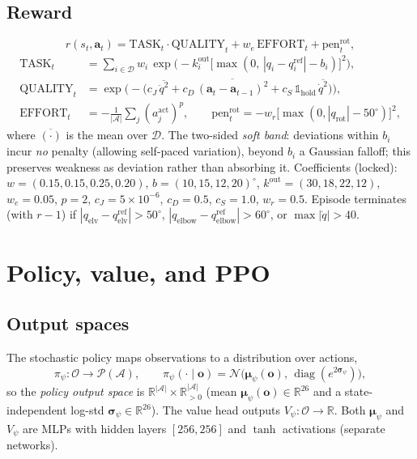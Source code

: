 \documentclass[11pt]{article}
\newcommand{\R}{\mathbb{R}}
\newcommand{\Obs}{\mathcal{O}}
\newcommand{\Act}{\mathcal{A}}
\newcommand{\Dset}{\mathcal{D}}
\newcommand{\qref}{q^{\mathrm{ref}}}
\renewcommand{\vec}[1]{\mathbf{#1}}
\newcommand{\diag}{\operatorname{diag}}
\begin{document}
\subsection{Reward}
\begin{equation}
r(s_t,\vec a_t)=\mathrm{TASK}_t\cdot\mathrm{QUALITY}_t+w_e\,\mathrm{EFFORT}_t+\mathrm{pen}^{\mathrm{rot}}_t,
\end{equation}
\begin{align}
\mathrm{TASK}_t&=\sum_{i\in\Dset} w_i\,\exp\!\Big(-k_i^{\mathrm{out}}\big[\max(0,\,|q_i-\qref_i|-b_i)\big]^2\Big),\\
\mathrm{QUALITY}_t&=\exp\!\Big(-\big(c_J\,\overline{\ddot q^2}+c_D\,\overline{(\vec a_t-\vec a_{t-1})^2}+c_S\,\mathbb 1_{\text{hold}}\,\overline{\dot q^2}\big)\Big),\\
\mathrm{EFFORT}_t&=-\tfrac{1}{|\Act|}\textstyle\sum_{j}(a^{\mathrm{act}}_j)^{p},\qquad
\mathrm{pen}^{\mathrm{rot}}_t=-w_r\big[\max(0,|q_{\text{rot}}|-50^\circ)\big]^2,
\end{align}
where $\overline{(\cdot)}$ is the mean over $\Dset$. The two-sided \emph{soft band}: deviations within $b_i$ incur \emph{no} penalty (allowing self-paced variation), beyond $b_i$ a Gaussian falloff; this preserves weakness as deviation rather than absorbing it. Coefficients (locked): $w=(0.15,0.15,0.25,0.20)$, $b=(10,15,12,20)^\circ$, $k^{\mathrm{out}}=(30,18,22,12)$, $w_e{=}0.05$, $p{=}2$, $c_J{=}5\!\times\!10^{-6}$, $c_D{=}0.5$, $c_S{=}1.0$, $w_r{=}0.5$. Episode terminates (with $r\!-\!1$) if $|q_{\text{elv}}{-}\qref_{\text{elv}}|>50^\circ$, $|q_{\text{elbow}}{-}\qref_{\text{elbow}}|>60^\circ$, or $\max|\dot q|>40$.

\section{Policy, value, and PPO}
\subsection{Output spaces}
The stochastic policy maps observations to a distribution over actions,
\begin{equation}
\pi_\psi:\Obs\to\mathcal P(\Act),\qquad \pi_\psi(\cdot\mid\vec o)=\mathcal N\!\big(\boldsymbol\mu_\psi(\vec o),\,\diag(e^{2\boldsymbol\sigma_\psi})\big),
\end{equation}
so the \emph{policy output space} is $\R^{|\Act|}\times\R_{>0}^{|\Act|}$ (mean $\boldsymbol\mu_\psi(\vec o)\in\R^{26}$ and a state-independent log-std $\boldsymbol\sigma_\psi\in\R^{26}$). The value head outputs $V_\psi:\Obs\to\R$. Both $\boldsymbol\mu_\psi$ and $V_\psi$ are MLPs with hidden layers $[256,256]$ and $\tanh$ activations (separate networks).
\end{document}
